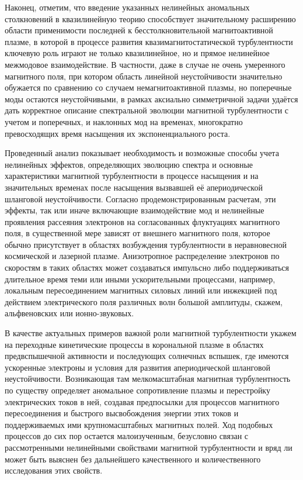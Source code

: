 Наконец, отметим, что введение указанных нелинейных аномальных столкновений в квазилинейную теорию способствует значительному расширению области применимости последней к бесстолкновительной магнитоактивной плазме, в которой в процессе развития квазимагнитостатической турбулентности ключевую роль играют не только квазилинейное, но и прямое нелинейное межмодовое взаимодействие. В частности, даже в случае не очень умеренного магнитного поля, при котором область линейной неустойчивости значительно обужается по сравнению со случаем немагнитоактивной плазмы, но поперечные моды остаются неустойчивыми, в рамках аксиально симметричной задачи удаётся дать корректное описание спектральной эволюции магнитной турбулентности с учетом и поперечных, и наклонных мод на временах, многократно превосходящих время насыщения их экспоненциального роста.

Проведенный анализ показывает необходимость и возможные способы учета нелинейных эффектов, определяющих эволюцию спектра и основные характеристики магнитной турбулентности в процессе насыщения и на значительных временах после насыщения вызвавшей её апериодической шланговой неустойчивости. Согласно продемонстрированным расчетам, эти эффекты, так или иначе включающие взаимодействие мод и нелинейные проявления рассеяния электронов на согласованных флуктуациях магнитного поля, в существенной мере зависят от внешнего магнитного поля, которое обычно присутствует в областях возбуждения турбулентности в неравновесной космической и лазерной плазме. Анизотропное распределение электронов по скоростям в таких областях может создаваться импульсно либо поддерживаться длительное время теми или иными ускорительными процессами, например, локальным пересоединением магнитных силовых линий или инжекцией под действием электрического поля различных волн большой амплитуды, скажем, альфвеновских или ионно-звуковых.

В качестве актуальных примеров важной роли магнитной турбулентности укажем на переходные кинетические процессы в корональной плазме в областях предвспышечной активности и последующих солнечных вспышек, где имеются ускоренные электроны и условия для развития апериодической шланговой неустойчивости. Возникающая там мелкомасштабная магнитная турбулентность по существу определяет аномальное сопротивление плазмы и перестройку электрических токов в ней, создавая предпосылки для процессов магнитного пересоединения и быстрого высвобождения энергии этих токов и поддерживаемых ими крупномасштабных магнитных полей. Ход подобных процессов до сих пор остается малоизученным, безусловно связан с рассмотренными нелинейными свойствами магнитной турбулентности и вряд ли может быть выяснен без дальнейшего качественного и количественного исследования этих свойств.
